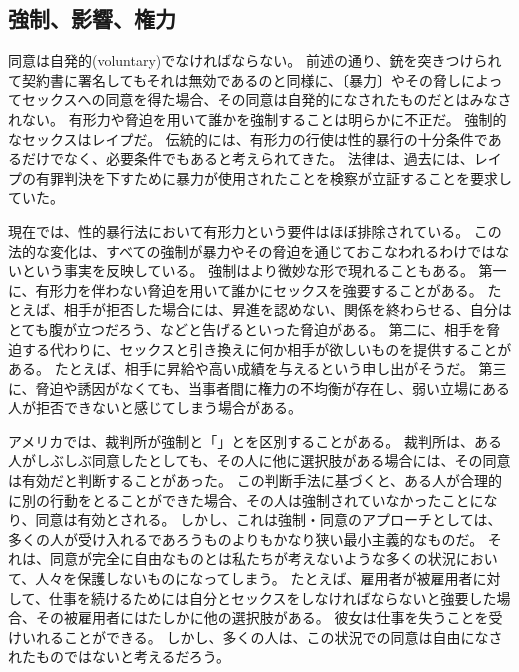\documentclass[paper=a4,book,openany]{jlreq}
\begin{document}
\subsection{強制、影響、権力}

同意は自発的(voluntary)でなければならない。
前述の通り、銃を突きつけられて契約書に署名してもそれは無効であるのと同様に、〔暴力〕やその脅しによってセックスへの同意を得た場合、その同意は自発的になされたものだとはみなされない。
有形力や脅迫を用いて誰かを強制することは明らかに不正だ。
強制的なセックスはレイプだ。
伝統的には、有形力の行使は性的暴行の十分条件であるだけでなく、必要条件でもあると考えられてきた。
法律は、過去には、レイプの有罪判決を下すために暴力が使用されたことを検察が立証することを要求していた。

現在では、性的暴行法において有形力という要件はほぼ排除されている。
この法的な変化は、すべての強制が暴力やその脅迫を通じておこなわれるわけではないという事実を反映している。
強制はより微妙な形で現れることもある。
第一に、有形力を伴わない脅迫を用いて誰かにセックスを強要することがある。
たとえば、相手が拒否した場合には、昇進を認めない、関係を終わらせる、自分はとても腹が立つだろう、などと告げるといった脅迫がある。
第二に、相手を脅迫する代わりに、セックスと引き換えに何か相手が欲しいものを提供することがある。
たとえば、相手に昇給や高い成績を与えるという申し出がそうだ。
第三に、脅迫や誘因がなくても、当事者間に権力の不均衡が存在し、弱い立場にある人が拒否できないと感じてしまう場合がある。

アメリカでは、裁判所が強制と「」とを区別することがある。
裁判所は、ある人がしぶしぶ同意したとしても、その人に他に選択肢がある場合には、その同意は有効だと判断することがあった\citep[p.130]{buchhandler-raphael11:_failur_consen}。
この判断手法に基づくと、ある人が合理的に別の行動をとることができた場合、その人は強制されていなかったことになり、同意は有効とされる。
しかし、これは強制・同意のアプローチとしては、多くの人が受け入れるであろうものよりもかなり狭い最小主義的なものだ。
それは、同意が完全に自由なものとは私たちが考えないような多くの状況において、人々を保護しないものになってしまう。
たとえば、雇用者が被雇用者に対して、仕事を続けるためには自分とセックスをしなければならないと強要した場合、その被雇用者にはたしかに他の選択肢がある。
彼女は仕事を失うことを受けいれることができる。
しかし、多くの人は、この状況での同意は自由になされたものではないと考えるだろう。
\end{document}
